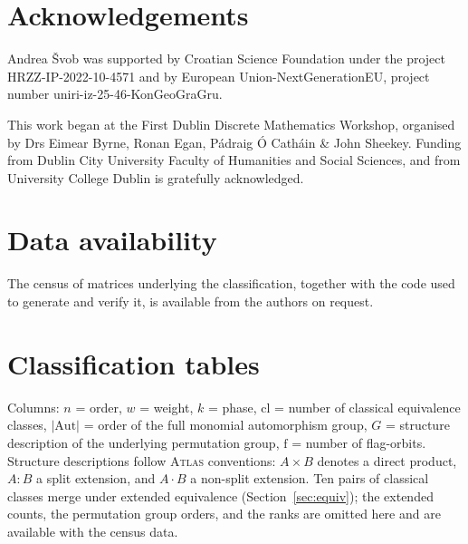 \documentclass{article}
\theoremstyle{definition}
\theoremstyle{remark}
\begin{document}
\section*{Acknowledgements}

Andrea \v Svob was supported by Croatian Science Foundation under the project HRZZ-IP-2022-10-4571 and by European Union-NextGenerationEU, project number uniri-iz-25-46-KonGeoGraGru.

This work began at the First Dublin Discrete Mathematics Workshop, organised by Drs Eimear Byrne, Ronan Egan, Pádraig Ó Catháin \& John Sheekey. Funding from Dublin City University Faculty of Humanities and Social Sciences, and from University College Dublin is gratefully acknowledged.

\section*{Data availability}

The census of matrices underlying the classification, together with the
code used to generate and verify it, is available from the authors on
request.


\flushleft{




}

\clearpage
\appendix
\appendix
\section{Classification tables}\label{app:tables}

Columns: $n$ = order, $w$ = weight, $k$ = phase, $\mathrm{cl}$ = number of
classical equivalence classes, $|\mathrm{Aut}|$ = order of the full monomial
automorphism group, $G$ = structure description of the underlying permutation
group, $\mathrm{f}$ = number of flag-orbits.  Structure descriptions follow
\textsc{Atlas} conventions: $A{\times}B$ denotes a direct product, $A{:}B$ a
split extension, and $A{\cdot}B$ a non-split extension.  Ten pairs of classical
classes merge under extended equivalence (Section~\ref{sec:equiv}); the
extended counts, the permutation group orders, and the ranks are omitted
here and are available with the census data.
\end{document}
